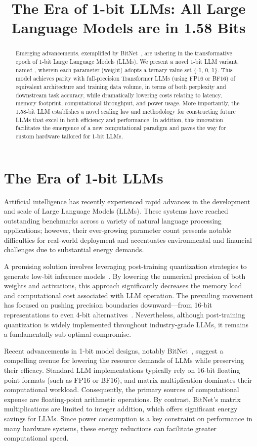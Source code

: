 \title{The Era of 1-bit LLMs: All Large Language Models are in 1.58 Bits}

\begin{abstract}
Emerging advancements, exemplified by BitNet~\cite{bitnet}, are ushering in the transformative epoch of 1-bit Large Language Models (LLMs). We present a novel 1-bit LLM variant, named \textbf{}, wherein each parameter (weight) adopts a ternary value set \{-1, 0, 1\}. This model achieves parity with full-precision Transformer LLMs (using FP16 or BF16) of equivalent architecture and training data volume, in terms of both perplexity and downstream task accuracy, while dramatically lowering costs relating to latency, memory footprint, computational throughput, and power usage. More importantly, the 1.58-bit LLM establishes a novel scaling law and methodology for constructing future LLMs that excel in both efficiency and performance. In addition, this innovation facilitates the emergence of a new computational paradigm and paves the way for custom hardware tailored for 1-bit LLMs.
\end{abstract}

\section{The Era of 1-bit LLMs}

Artificial intelligence has recently experienced rapid advances in the development and scale of Large Language Models (LLMs). These systems have reached outstanding benchmarks across a variety of natural language processing applications; however, their ever-growing parameter count presents notable difficulties for real-world deployment and accentuates environmental and financial challenges due to substantial energy demands.

A promising solution involves leveraging post-training quantization strategies to generate low-bit inference models~\cite{smoothquant, gptq, quip, quip_sharp}. By lowering the numerical precision of both weights and activations, this approach significantly decreases the memory load and computational cost associated with LLM operation. The prevailing movement has focused on pushing precision boundaries downward—from 16-bit representations to even 4-bit alternatives~\cite{gptq, awq}. Nevertheless, although post-training quantization is widely implemented throughout industry-grade LLMs, it remains a fundamentally sub-optimal compromise.

Recent advancements in 1-bit model designs, notably BitNet~\cite{bitnet}, suggest a compelling avenue for lowering the resource demands of LLMs while preserving their efficacy. Standard LLM implementations typically rely on 16-bit floating point formats (such as FP16 or BF16), and matrix multiplication dominates their computational workload. Consequently, the primary sources of computational expense are floating-point arithmetic operations. By contrast, BitNet’s matrix multiplications are limited to integer addition, which offers significant energy savings for LLMs. Since power consumption is a key constraint on performance in many hardware systems, these energy reductions can facilitate greater computational speed.

